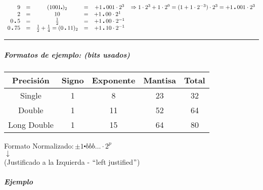 $$
\begin{array}{rccccl}
9 & = & (1001\centerdot)_{2} & = & + 1\centerdot001 \cdot 2^{3} & \Rightarrow 1 \cdot 2^{3} + 1 \cdot 2^{0} = (1+1\cdot 2^{-3})\cdot2^{3} = + 1\centerdot001 \cdot 2^{3}\\
2 & = & 10 & = & + 1\centerdot00 \cdot 2^{1}\hspace{2.5mm} &\\
0\centerdot5 & = & \frac{1}{2} & = & + 1\centerdot00 \cdot 2^{-1} &\\
0\centerdot75 & = & \frac{1}{2} + \frac{1}{4} = (0\centerdot11)_{2} & = & + 1\centerdot10 \cdot 2^{-1} &\\
\end{array}
$$
\vspace{1mm}
\begin{center}
\rule{15cm}{0.1mm}
\end{center}
\subparagraph{Formatos de ejemplo: (bits usados)}
\begin{center}
\begin{tabular}{|c|c|c|c|c|}
\hline 
Precisión & Signo & Exponente & Mantisa & Total \\ 
\hline 
Single & 1 & 8 & 23 & 32 \\ 
\hline 
Double & 1 & 11 & 52 & 64 \\ 
\hline 
Long Double & 1 & 15 & 64 & 80 \\ 
\hline 
\end{tabular}
\end{center}
\vspace{1mm}
\begin{center}
{Formato Normalizado:\,$ \pm 1\centerdot bbb\ldots \cdot 2^{p}$}\\
$\downarrow$\\
\hspace{5cm}(Justificado a la Izquierda - $``$left justified$"$)
\end{center}

\subparagraph{Ejemplo} 

